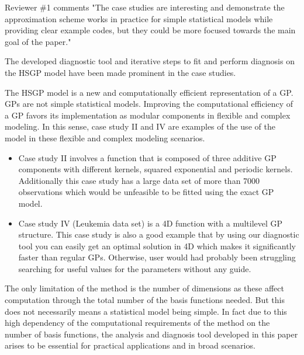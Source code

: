 \documentclass[11pt]{report}
\begin{document}
Reviewer \#1 comments "The case studies are interesting and demonstrate the approximation scheme works in practice for simple statistical models while providing clear example codes, but they could be more focused towards the main goal of the paper."

The developed diagnostic tool and iterative steps to fit and perform diagnosis on the HSGP model have been made prominent in the case studies.

The HSGP model is a new and computationally efficient representation of a GP. GPs are not simple statistical models. Improving the computational efficiency of a GP favors its implementation as modular components in flexible and complex modeling. In this sense, case study II and IV are examples of the use of the model in these flexible and complex modeling scenarios.

\begin{itemize}
\item Case study II involves a function that is composed of three additive GP components with different kernels, squared exponential and periodic kernels. Additionally this case study has a large data set of more than 7000 observations which would be unfeasible to be fitted using the exact GP model.

\item Case study IV (Leukemia data set) is a 4D function with a multilevel GP structure. This case study is also a good example that by using our diagnostic tool you can easily get an optimal solution in 4D which makes it significantly faster than regular GPs. Otherwise, user would had probably been struggling searching for useful values for the parameters without any guide.
\end{itemize}

The only limitation of the method is the number of dimensions as these affect computation through the total number of the basis functions needed. But this does not necessarily means a statistical model being simple.
In fact due to this high dependency of the computational requirements of the method on the number of basis functions, the analysis and diagnosis tool developed in this paper arises to be essential for practical applications and in broad scenarios.
\end{document}
